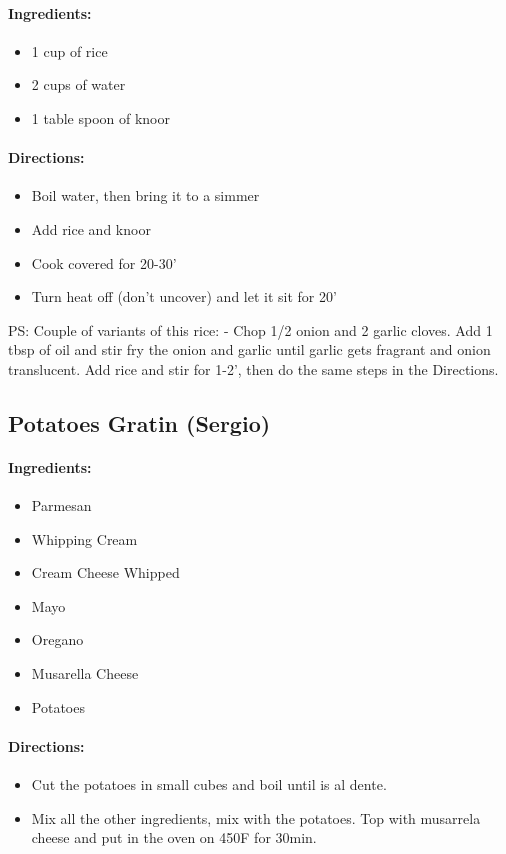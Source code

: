 \documentclass{article}
\begin{document}
\paragraph{Ingredients:}

\begin{itemize}
	\item 1 cup of rice
	\item 2 cups of water
	\item 1 table spoon of knoor
\end{itemize}

\paragraph{Directions:}
\begin{itemize}
	\item Boil water, then bring it to a simmer
	\item Add rice and knoor
	\item Cook covered for 20-30'
	\item Turn heat off (don't uncover) and let it sit for 20'
\end{itemize} 

PS: Couple of variants of this rice: - Chop 1/2 onion and 2 garlic cloves. Add 1 tbsp of oil and stir fry the onion and garlic until garlic gets fragrant and onion translucent. Add rice and stir for 1-2’, then do the same
steps in the Directions.

\subsection{Potatoes Gratin (Sergio)}

\paragraph{Ingredients:}

\begin{itemize}
	\item Parmesan
	\item Whipping Cream
	\item Cream Cheese Whipped
	\item Mayo
	\item Oregano
	\item Musarella Cheese
	\item Potatoes
\end{itemize}

\paragraph{Directions:}
\begin{itemize}
	\item Cut the potatoes in small cubes and boil until is al dente.
	\item Mix all the other ingredients, mix with the potatoes. Top with musarrela cheese and put in the oven on 450F for 30min.
\end{itemize}
\end{document}
